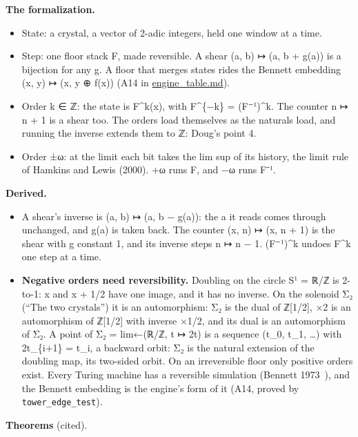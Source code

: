 \textbf{The formalization.}

\begin{itemize}
\item State: a crystal, a vector of 2-adic integers, held one window at a time.
\item Step: one floor stack F, made reversible. A shear (a, b) ↦ (a, b + g(a)) is a bijection for any g. A floor that merges states rides the Bennett embedding (x, y) ↦ (x, y ⊕ f(x)) (A14 in \hyperref[chap:engine-table]{engine\_\allowbreak{}table.md}).
\item Order k ∈ ℤ: the state is F\textasciicircum{}k(x), with F\textasciicircum{}\{−k\} = (F⁻¹)\textasciicircum{}k. The counter n ↦ n + 1 is a shear too. The orders load themselves as the naturals load, and running the inverse extends them to ℤ: Doug's point 4.
\item Order ±ω: at the limit each bit takes the lim sup of its history, the limit rule of Hamkins and Lewis (2000). +ω runs F, and −ω runs F⁻¹.
\end{itemize}

\textbf{Derived.}

\begin{itemize}
\item A shear's inverse is (a, b) ↦ (a, b − g(a)): the a it reads comes through unchanged, and g(a) is taken back. The counter (x, n) ↦ (x, n + 1) is the shear with g constant 1, and its inverse steps n ↦ n − 1. (F⁻¹)\textasciicircum{}k undoes F\textasciicircum{}k one step at a time.
\item \textbf{Negative orders need reversibility.} Doubling on the circle S¹ = ℝ/ℤ is 2-to-1: x and x + 1/2 have one image, and it has no inverse. On the solenoid Σ₂ (“The two crystals”) it is an automorphism: Σ₂ is the dual of ℤ[1/2], ×2 is an automorphism of ℤ[1/2] with inverse ×1/2, and its dual is an automorphism of Σ₂. A point of Σ₂ = lim←(ℝ/ℤ, t ↦ 2t) is a sequence (t\_\allowbreak{}0, t\_\allowbreak{}1, …) with 2t\_\allowbreak{}\{i+1\} = t\_\allowbreak{}i, a backward orbit: Σ₂ is the natural extension of the doubling map, its two-sided orbit. On an irreversible floor only positive orders exist. Every Turing machine has a reversible simulation (Bennett 1973~\cite{src:Bennett-1973}), and the Bennett embedding is the engine's form of it (A14, proved by \texttt{tower\_\allowbreak{}edge\_\allowbreak{}test}).
\end{itemize}

\textbf{Theorems} (cited).

